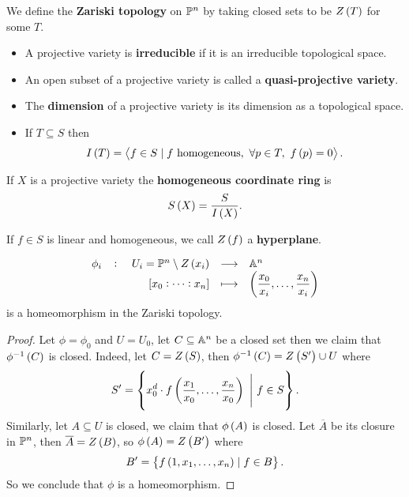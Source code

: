 \begin{definition}
We define the \textbf{Zariski topology} on $ \P^n $ by taking closed sets to be $ Z\br{T} $ for some $ T $.
\end{definition}

\begin{definition}
\hfill
\begin{itemize}
\item A projective variety is \textbf{irreducible} if it is an irreducible topological space.
\item An open subset of a projective variety is called a \textbf{quasi-projective variety}.
\item The \textbf{dimension} of a projective variety is its dimension as a topological space.
\item If $ T \subseteq S $ then
$$ I\br{T} = \abr{f \in S \mid f \ \text{homogeneous}, \ \forall p \in T, \ f\br{p} = 0}. $$
\end{itemize}
\end{definition}

\begin{definition}
If $ X $ is a projective variety the \textbf{homogeneous coordinate ring} is
$$ S\br{X} = \dfrac{S}{I\br{X}}. $$
\end{definition}

\begin{definition}
If $ f \in S $ is linear and homogeneous, we call $ Z\br{f} $ a \textbf{hyperplane}.
\end{definition}


\begin{proposition}
$$ \function[\phi_i]{U_i = \P^n \setminus Z\br{x_i}}{\A^n}{\sbr{x_0 : \dots : x_n}}{\br{\dfrac{x_0}{x_i}, \dots, \dfrac{x_n}{x_i}}} $$
is a homeomorphism in the Zariski topology.
\end{proposition}

\begin{proof}
Let $ \phi = \phi_0 $ and $ U = U_0 $, let $ C \subseteq \A^n $ be a closed set then we claim that $ \phi^{-1}\br{C} $ is closed. Indeed, let $ C = Z\br{S} $, then $ \phi^{-1}\br{C} = Z\br{S'} \cup U $ where
$$ S' = \cbr{x_0^d \cdot f\br{\dfrac{x_1}{x_0}, \dots, \dfrac{x_n}{x_0}} \ \Bigg| \ f \in S}. $$
Similarly, let $ A \subseteq U $ is closed, we claim that $ \phi\br{A} $ is closed. Let $ \overline{A} $ be its closure in $ \P^n $, then $ \overline{A} = Z\br{B} $, so $ \phi\br{A} = Z\br{B'} $ where
$$ B' = \cbr{f\br{1, x_1, \dots, x_n} \mid f \in B}. $$
So we conclude that $ \phi $ is a homeomorphism.
\end{proof}

